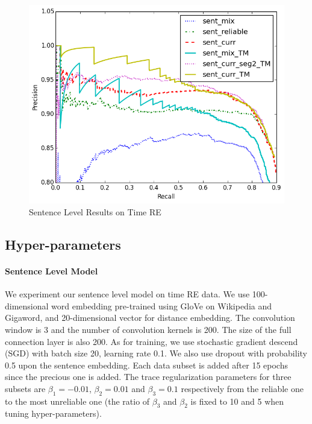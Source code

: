 \begin{figure}[htbp]
\begin{center}
\includegraphics[width=0.9\linewidth]{figures/sent_time_exp_overall.png}
\caption{Sentence Level Results on Time RE}
\label{fig: sent_luo}
\end{center}
\end{figure}

\subsection{Hyper-parameters}
\paragraph{Sentence Level Model}
We experiment our sentence level model on time RE data. We use 100-dimensional word embedding pre-trained using GloVe \cite{pennington2014glove} on Wikipedia and Gigaword, and 20-dimensional vector for distance embedding. The convolution window is 3 and the number of convolution kernels is 200. The size of the full connection layer is also 200. As for training, we use stochastic gradient descend (SGD) with batch size 20, learning rate 0.1. We also use dropout with probability 0.5 upon the sentence embedding. Each data subset is added after 15 epochs since the precious one is added. The trace regularization parameters for three subsets are $\beta_1=-0.01$, $\beta_2=0.01$ and $\beta_3=0.1$ respectively from the reliable one to the most unreliable one (the ratio of $\beta_3$ and $\beta_2$ is fixed to 10 and 5 when tuning hyper-parameters).

